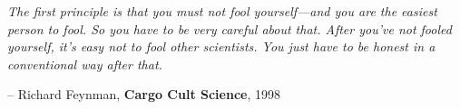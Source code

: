 \documentclass[\main/thesis.tex]{subfiles}
\begin{document}
\begin{quotepage}
 \vspace*{1in}
 \begin{center}
	\emph{The first principle is that you must not fool
          yourself—and you are the easiest person to fool.  So you
          have to be very careful about that.  After you’ve not fooled
          yourself, it’s easy not to fool other scientists.
          You just have to be honest in a conventional way after that.}
	\begin{flushright}
		-- Richard Feynman, \textbf{Cargo Cult Science}, 1998
	\end{flushright}
 \end{center}
\end{quotepage}
\end{document}
